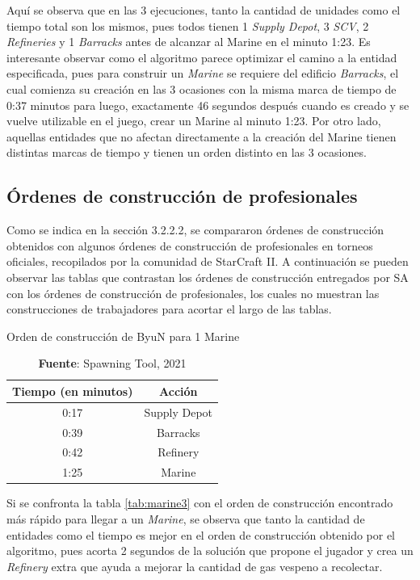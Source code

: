 Aquí se observa que en las 3 ejecuciones, tanto la cantidad de unidades como el tiempo total son los mismos, pues todos tienen 1 \textit{Supply Depot}, 3 \textit{SCV}, 2 \textit{Refineries} y 1 \textit{Barracks} antes de alcanzar al Marine en el minuto 1:23. Es interesante observar como el algoritmo parece optimizar el camino a la entidad especificada, pues para construir un \textit{Marine} se requiere del edificio \textit{Barracks}, el cual comienza su creación en las 3 ocasiones con la misma marca de tiempo de 0:37 minutos para luego, exactamente 46 segundos después cuando es creado y se vuelve utilizable en el juego, crear un Marine al minuto 1:23. Por otro lado, aquellas entidades que no afectan directamente a la creación del Marine tienen distintas marcas de tiempo y tienen un orden distinto en las 3 ocasiones.

\subsection{Órdenes de construcción de profesionales}

Como se indica en la sección 3.2.2.2, se compararon órdenes de construcción obtenidos con algunos órdenes de construcción de profesionales en torneos oficiales, recopilados por la comunidad de StarCraft II. A continuación se pueden observar las tablas que contrastan los órdenes de construcción entregados por SA con los órdenes de construcción de profesionales, los cuales no muestran las construcciones de trabajadores para acortar el largo de las tablas.

\begin{table}[H]
\centering
\def\arraystretch{1.2}
\captionsetup{justification=centering}
\caption{Orden de construcción de ByuN para 1 Marine}
\label{tab:marineByun}
\begin{tabular}{|c|c|}
\hline
\textbf{Tiempo (en minutos)} & \textbf{Acción} \\
\hline
0:17 &	  Supply Depot	  \\
0:39 &	  Barracks	  \\
0:42 &	  Refinery	  \\
1:25 &	  Marine \\ \hline
\end{tabular}
\caption*{\textbf{Fuente}: Spawning Tool, 2021}
\end{table}

Si se confronta la tabla \ref{tab:marine3} con el orden de construcción encontrado más rápido para llegar a un \textit{Marine}, se observa que tanto la cantidad de entidades como el tiempo es mejor en el orden de construcción obtenido por el algoritmo, pues acorta 2 segundos de la solución que propone el jugador y crea un \textit{Refinery} extra que ayuda a mejorar la cantidad de gas vespeno a recolectar.

